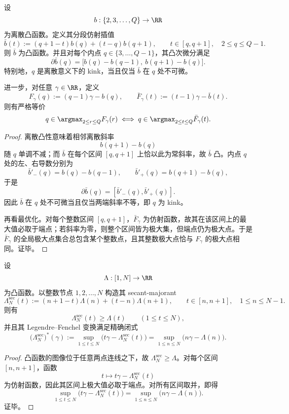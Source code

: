 \begin{theorem}\label{thm:conclusion-discrete-kink-fan-piecewise-linearization}
设
\[
b:\{2,3,\dots,Q\}\to\RR
\]
为离散凸函数。定义其分段仿射插值
\[
\bar b(t):=(q+1-t)b(q)+(t-q)b(q+1),
\qquad
t\in[q,q+1],\quad 2\le q\le Q-1.
\]
则 \(\bar b\) 为凸函数。并且对每个内点 \(q\in\{3,\dots,Q-1\}\)，其凸次微分满足
\[
\partial \bar b(q)=\bigl[b(q)-b(q-1),\ b(q+1)-b(q)\bigr].
\]
特别地，\(q\) 是离散意义下的 kink，当且仅当 \(\bar b\) 在 \(q\) 处不可微。

进一步，对任意 \(\gamma\in\RR\)，定义
\[
F_\gamma(q):=(q-1)\gamma-b(q),
\qquad
\bar F_\gamma(t):=(t-1)\gamma-\bar b(t).
\]
则有严格等价
\[
q\in \argmax_{2\le r\le Q}F_\gamma(r)
\iff
q\in \argmax_{2\le t\le Q}\bar F_\gamma(t).
\]
\end{theorem}
\begin{proof}
离散凸性意味着相邻离散斜率
\[
b(q+1)-b(q)
\]
随 \(q\) 单调不减；而 \(\bar b\) 在每个区间 \([q,q+1]\) 上恰以此为常斜率，故 \(\bar b\) 凸。内点 \(q\) 处的左、右导数分别为
\[
\bar b'_-(q)=b(q)-b(q-1),
\qquad
\bar b'_+(q)=b(q+1)-b(q),
\]
于是
\[
\partial\bar b(q)=[\bar b'_-(q),\bar b'_+(q)].
\]
因此 \(\bar b\) 在 \(q\) 处不可微当且仅当两端斜率不等，即 \(q\) 为 kink。

再看最优化。对每个整数区间 \([q,q+1]\)，\(\bar F_\gamma\) 为仿射函数，故其在该区间上的最大值必取于端点；若斜率为零，则整个区间皆为极大集，但端点仍为极大点。于是 \(\bar F_\gamma\) 的全局极大点集合总包含某个整数点，且其整数极大点恰与 \(F_\gamma\) 的极大点相同。证毕。
\end{proof}

\begin{theorem}\label{thm:conclusion-continuous-pressure-secant-majorant-discrete-legendre}
设
\[
\Lambda:[1,N]\to\RR
\]
为凸函数。以整数节点 \(1,2,\dots,N\) 构造其 secant-majorant
\[
\Lambda_N^{\mathrm{sec}}(t):=(n+1-t)\Lambda(n)+(t-n)\Lambda(n+1),
\qquad
t\in[n,n+1],\quad 1\le n\le N-1.
\]
则有
\[
\Lambda_N^{\mathrm{sec}}(t)\ge \Lambda(t)
\qquad
(1\le t\le N),
\]
并且其 Legendre--Fenchel 变换满足精确闭式
\[
\bigl(\Lambda_N^{\mathrm{sec}}\bigr)^\ast(\gamma)
:=
\sup_{1\le t\le N}\bigl(t\gamma-\Lambda_N^{\mathrm{sec}}(t)\bigr)
=
\sup_{1\le n\le N}\bigl(n\gamma-\Lambda(n)\bigr).
\]
\end{theorem}
\begin{proof}
凸函数的图像位于任意两点连线之下，故 \(\Lambda_N^{\mathrm{sec}}\ge\Lambda\)。对每个区间 \([n,n+1]\)，函数
\[
t\longmapsto t\gamma-\Lambda_N^{\mathrm{sec}}(t)
\]
为仿射函数，因此其区间上极大值必取于端点。对所有区间取并，即得
\[
\sup_{1\le t\le N}\bigl(t\gamma-\Lambda_N^{\mathrm{sec}}(t)\bigr)
=
\sup_{1\le n\le N}\bigl(n\gamma-\Lambda(n)\bigr).
\]
证毕。
\end{proof}

